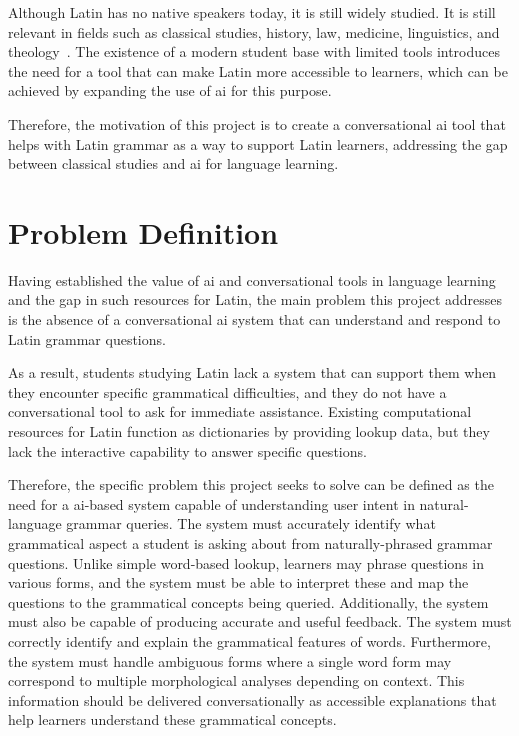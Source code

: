 Although Latin has no native speakers today, it is still widely 
studied. It is still relevant in fields such as classical 
studies, history, law, medicine, linguistics, and theology~\cite{clackson2011companion}. 
The existence of a modern student base with limited tools 
introduces the need for a tool that can make Latin more 
accessible to learners, which can be achieved by expanding 
the use of \gls{ai} for this purpose.

Therefore, the motivation of this project is to create a 
conversational \gls{ai} tool that helps with Latin grammar as a 
way to support Latin learners, addressing the gap between 
classical studies and \gls{ai} for language learning.

\section{Problem Definition}%
\label{sec:problem_definition}

Having established the value of \gls{ai} and conversational tools 
in language learning and the gap in such resources for Latin, 
the main problem this project addresses is the absence of a 
conversational \gls{ai} system that can understand and respond to 
Latin grammar questions.

As a result, students studying Latin lack a system that can 
support them when they encounter specific grammatical 
difficulties, and they do not have a conversational tool to 
ask for immediate assistance. Existing computational resources 
for Latin function as dictionaries by providing lookup data, 
but they lack the interactive capability to answer specific 
questions.

Therefore, the specific problem this project seeks to solve 
can be defined as the need for a \gls{ai}-based system capable of 
understanding user intent in natural-language grammar queries. 
The system must accurately identify what grammatical aspect a 
student is asking about from naturally-phrased grammar 
questions. Unlike simple word-based lookup, learners may 
phrase questions in various forms, and the system must be 
able to interpret these and map the questions to the 
grammatical concepts being queried. Additionally, the system 
must also be capable of producing accurate and useful feedback. 
The system must correctly identify and explain the grammatical 
features of words. Furthermore, the system must handle 
ambiguous forms where a single word form may correspond 
to multiple morphological analyses depending on context. 
This information should be delivered conversationally as 
accessible explanations that help learners understand these 
grammatical concepts.

